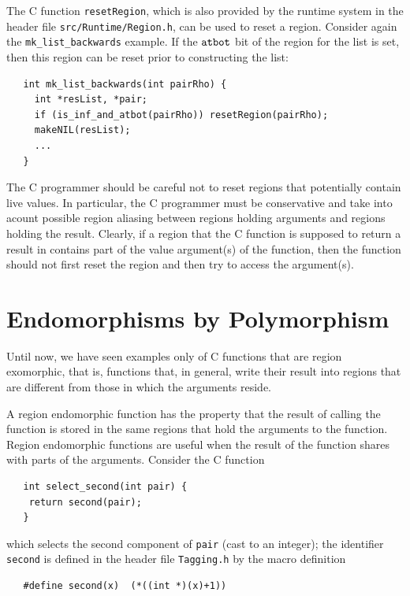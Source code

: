 \documentclass[12pt]{book}
\begin{document}
The C function \texttt{resetRegion}, which is also provided by the
runtime system in the header file {\tt src/Runtime/Region.h}, can be
used to reset a region. Consider again the \verb|mk_list_backwards|
example. If the $\hbox{\tt atbot}$ bit of the region for the list is set, then
this region can be reset prior to constructing the list:
%
\begin{verbatim}
   int mk_list_backwards(int pairRho) {
     int *resList, *pair;
     if (is_inf_and_atbot(pairRho)) resetRegion(pairRho);
     makeNIL(resList);  
     ...
   }
\end{verbatim}
The C programmer should be careful not to reset regions that
potentially contain live values. In particular, the C programmer must be
conservative and take into acount possible region aliasing between
regions holding arguments and regions holding the result. 
Clearly, if a region that the C function is supposed to
return a result in contains part of the value argument(s) of the function,
then the function should not first reset the region and 
then try to access the argument(s).

\section{Endomorphisms by Polymorphism}
\label{C_polymorphism.sec}
Until now, we have seen examples only of C functions that are region
exomorphic, that is, functions that, in general, write their result
into regions that are different from those in which the arguments
reside.

A region endomorphic function has the property that the result of
calling the function is stored in the same regions that hold the
arguments to the function. Region endomorphic functions are useful
when the result of the function shares with parts of the arguments.
Consider the C function
\begin{verbatim}
   int select_second(int pair) {
    return second(pair);
   }
\end{verbatim}
which selects the second component of {\tt pair} (cast to an
integer); the identifier {\tt second} is defined in the header
file {\tt Tagging.h} by the macro definition
\begin{verbatim}
   #define second(x)  (*((int *)(x)+1))
\end{verbatim}
\end{document}

